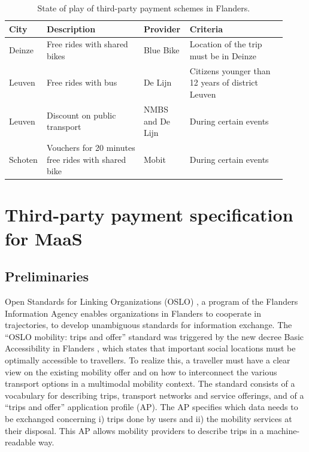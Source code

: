\documentclass[runningheads]{llncs}
\begin{document}
\begin{table}
\caption{State of play of third-party payment schemes in Flanders.}\label{tab1}
\begin{tabular}{| p{0.10\linewidth} | p{0.34\linewidth} | p{0.14\linewidth} | p{0.34\linewidth}|}
\hline
City &  Description & Provider & Criteria\\
\hline
Deinze &  Free rides with shared bikes & Blue Bike & Location of the trip must be in Deinze\\
Leuven & Free rides with bus & De Lijn & Citizens younger than 12 years of district Leuven\\
Leuven & Discount on public transport & NMBS and De Lijn & During certain events\\
Schoten & Vouchers for 20 minutes free rides with shared bike & Mobit & During certain events \\
\hline
\end{tabular}
\label{table-tpp}
\end{table}

\section{Third-party payment specification for MaaS}
\label{section:tpp}

\subsection{Preliminaries}

Open Standards for Linking Organizations (OSLO) \cite{buyle_egose_2016}, a program of the Flanders Information Agency enables organizations in Flanders to cooperate in trajectories, to develop unambiguous standards for information exchange. The “OSLO mobility: trips and offer” standard \cite{tripsandoffer} was triggered by the new decree Basic Accessibility in Flanders \cite{ba}, which states that important social locations must be optimally accessible to travellers. To realize this, a traveller must have a clear view on the existing mobility offer and on how to interconnect the various transport options in a multimodal mobility context. The standard consists of a vocabulary for describing trips, transport networks and service offerings, and of a “trips and offer” application profile (AP). The AP specifies which data needs to be exchanged concerning i) trips done by users and ii) the mobility services at their disposal. This AP allows mobility providers to describe trips in a machine-readable way.
\end{document}
